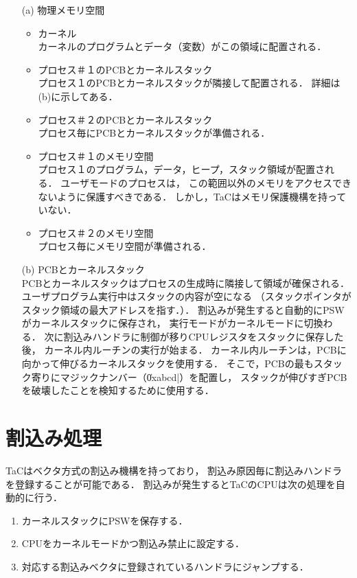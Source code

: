 \begin{enumerate}
\item[(a)] 物理メモリ空間
  \begin{itemize}
  \item カーネル \\
    カーネルのプログラムとデータ（変数）がこの領域に配置される．
  \item プロセス＃１のPCBとカーネルスタック \\
    プロセス１のPCBとカーネルスタックが隣接して配置される．
    詳細は(b)に示してある．
  \item プロセス＃２のPCBとカーネルスタック \\
    プロセス毎にPCBとカーネルスタックが準備される．
  \item プロセス＃１のメモリ空間 \\
    プロセス１のプログラム，データ，ヒープ，スタック領域が配置される．
    ユーザモードのプロセスは，
    この範囲以外のメモリをアクセスできないように保護すべきである．
    しかし，TaCはメモリ保護機構を持っていない．
  \item プロセス＃２のメモリ空間 \\
    プロセス毎にメモリ空間が準備される．
  \end{itemize}
\item[(b)] PCBとカーネルスタック \\
  PCBとカーネルスタックはプロセスの生成時に隣接して領域が確保される．
  ユーザプログラム実行中はスタックの内容が空になる
  （スタックポインタがスタック領域の最大アドレスを指す．）．
  割込みが発生すると自動的にPSWがカーネルスタックに保存され，
  実行モードがカーネルモードに切換わる．
  次に割込みハンドラに制御が移りCPUレジスタをスタックに保存した後，
  カーネル内ルーチンの実行が始まる．
  カーネル内ルーチンは，PCBに向かって伸びるカーネルスタックを使用する．
  そこで，PCBの最もスタック寄りにマジックナンバー（\|0xabcd|）を配置し，
  スタックが伸びすぎPCBを破壊したことを検知するために使用する．
\end{enumerate}

\section{割込み処理}
\label{tacosInterrupt}
TaCはベクタ方式の割込み機構を持っており，
割込み原因毎に割込みハンドラを登録することが可能である．
割込みが発生するとTaCのCPUは次の処理を自動的に行う．

\begin{enumerate}
\item カーネルスタックにPSWを保存する．
\item CPUをカーネルモードかつ割込み禁止に設定する．
\item 対応する割込みベクタに登録されているハンドラにジャンプする．
\end{enumerate}

